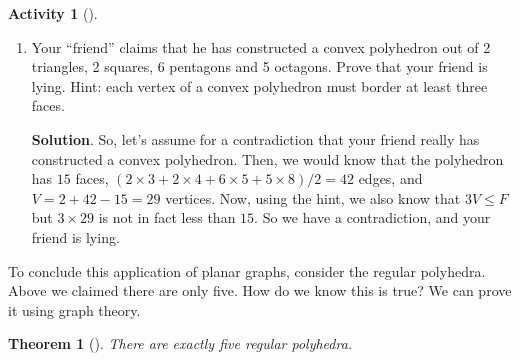 \documentclass[10pt,]{book}
\theoremstyle{plain}
\newtheorem{theorem}{Theorem}[section]
\theoremstyle{definition}
\theoremstyle{definition}
\theoremstyle{definition}
\newtheorem{activity}[project]{Activity}
\numberwithin{equation}{chapter}
\begin{document}
\begin{activity}[]
\begin{enumerate}[font=\bfseries,label=(\alph*),ref=\alph*]
\item\label{task-43} \hypertarget{p-315}{}%
Your ``friend'' claims that he has constructed a convex polyhedron out of 2 triangles, 2 squares, 6 pentagons and 5 octagons. Prove that your friend is lying. Hint: each vertex of a convex polyhedron must border at least three faces.%
\par\smallskip%
\noindent\textbf{Solution}.\hypertarget{solution-20}{}\quad%
\hypertarget{p-316}{}%
So, let's assume for a contradiction that your friend really has constructed a convex polyhedron. Then, we would know that the polyhedron has \(15\) faces, \((2\times 3+2\times 4+6\times 5+5\times 8)/2 = 42\) edges, and \(V=2+42-15=29\) vertices. Now, using the hint, we also know that \(3V\leq F\) but \(3\times 29\) is not in fact less than \(15\). So we have a contradiction, and your friend is lying.%
\end{enumerate}
\end{activity}
\hypertarget{p-317}{}%
To conclude this application of planar graphs, consider the regular polyhedra. Above we claimed there are only five. How do we know this is true? We can prove it using graph theory.%
\begin{theorem}[{}]\label{theorem-4}
\hypertarget{p-318}{}%
There are exactly five regular polyhedra.%
\end{theorem}
\end{document}

